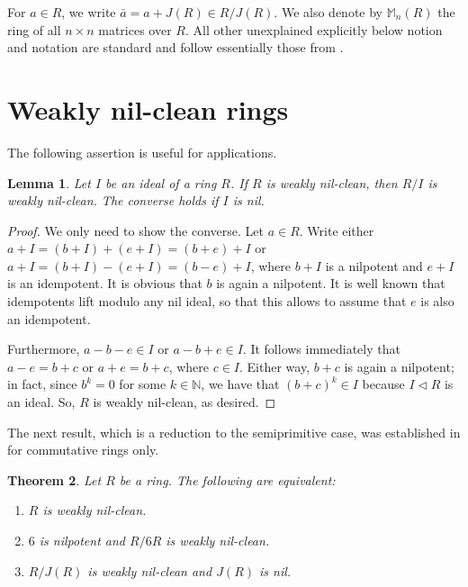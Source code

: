 \documentclass[12]{amsart}
\newtheorem{thm}{Theorem}
\newtheorem{lem}[thm]{Lemma}
\theoremstyle{definition}
\numberwithin{equation}{section}
\begin{document}
 For $a\in R$, we write $\bar a=a+J(R)\in R/J(R)$. We also denote by ${\mathbb M}_n(R)$ the ring of all $n\times n$ matrices over $R$. All other unexplained explicitly below notion and notation are standard and follow essentially those from \cite{L01}.
 
\section{Weakly nil-clean rings}

The following assertion is useful for applications.

\begin{lem}\label{epi} Let $I$ be an ideal of a ring $R$. If $R$ is weakly nil-clean, then $R/I$ is weakly nil-clean. The converse holds if $I$ is nil.
\end{lem}

\begin{proof} We only need to show the converse. Let $a\in R$. Write either $a+I=(b+I)+(e+I)=(b+e)+I$ or $a+I=(b+I)-(e+I)=(b-e)+I$, where $b+I$ is a nilpotent and $e+I$ is an idempotent. It is obvious that $b$ is again a nilpotent. It is well known that
idempotents lift modulo any nil ideal, so that this allows to assume that $e$ is also an idempotent.

Furthermore, $a-b-e \in I$ or $a-b+e \in I$. It follows immediately that $a-e = b+c$ or $a+e=b+c$, where $c\in I$. Either way, $b+c$ is again a nilpotent; in fact, since $b^k=0$ for some $k\in \mathbb{N}$, we have that $(b+c)^k\in I$ because $I\lhd R$ is an ideal. So, $R$ is weakly nil-clean, as desired.
\end{proof}

The next result, which is a reduction to the semiprimitive case, was established in \cite{DM14} for commutative rings only.

\begin{thm}\label{one}
Let $R$ be a ring. The following are equivalent:
\begin{enumerate}
\item $R$ is weakly nil-clean.

\item $6$ is nilpotent and $R/6R$ is weakly nil-clean.

\item $R/J(R)$ is weakly nil-clean and $J(R)$ is nil.
\end{enumerate}
\end{thm}
\end{document}

